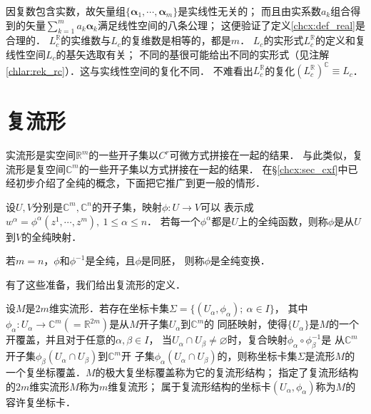 因复数包含实数，故矢量组$\{\boldsymbol{\alpha}_1,\cdots,\boldsymbol{\alpha}_m\}$是实线性无关的；
而且由实系数$a_k$组合得到的矢量$\sum_{k=1}^{m} a_k \boldsymbol{\alpha}_k$满足线性空间的八条公理；
这便验证了定义\ref{chcx:def_real}是合理的．
$L^{\mathbb{R}}_c$的{\kaishu 实维数}与$L_c$的{\kaishu 复维数}是相等的，都是$m$．
$L_c$的实形式$L^{\mathbb{R}}_c$的定义和复线性空间$L_c$的基矢选取有关；
不同的基很可能给出不同的实形式（见注解\ref{chlar:rek_rc}）．这与实线性空间的复化不同．
不难看出$L^{\mathbb{R}}_c$的复化$(L^{\mathbb{R}}_c)^{\mathbb{C}} \equiv L_c$．










\section{复流形}\label{chcx:sec_cxmanifold}
实流形是实空间$\mathbb{R}^m$的一些开子集以$C^r$可微方式拼接在一起的结果．
与此类似，复流形是复空间$\mathbb{C}^m$的一些开子集以方式拼接在一起的结果．
在\S\ref{chcx:sec_cxf}中已经初步介绍了全纯的概念，下面把它推广到更一般的情形．



\begin{definition}
    设$U,V$分别是$\mathbb{C}^m,\mathbb{C}^n$的开子集，映射$\phi:U\to V$可以
    表示成$w^\alpha=\phi^\alpha(z^1,\cdots,z^m),\ 1\leqslant \alpha \leqslant n$．
    若每一个$\phi^\alpha$都是$U$上的全纯函数，则称$\phi$是从$U$到$V$的{\heiti 全纯映射}．
    
    若$m=n$，$\phi$和$\phi^{-1}$是全纯，且$\phi$是同胚，
    则称$\phi$是{\heiti 全纯变换}．  
\end{definition}

有了这些准备，我们给出复流形的定义．
\begin{definition}\label{chcx:def_cxmanifold}
    设$M$是$2m$维实流形．若存在坐标卡集$\Sigma=\{(U_\alpha,\phi_\alpha);\ \alpha\in I\}$，
    其中$\phi_\alpha: U_\alpha \to \mathbb{C}^m(=\mathbb{R}^{2m})$是从$M$开子集$U_\alpha$到$\mathbb{C}^m$的
    同胚映射，使得$\{U_\alpha\}$是$M$的一个开覆盖，并且对于任意的$\alpha,\beta\in I$，
    当$U_\alpha \cap U_\beta \neq \varnothing$时，复合映射$\phi_\alpha \circ \phi^{-1}_\beta$是
    从$\mathbb{C}^m$开子集$\phi_\beta(U_\alpha \cap U_\beta)$到$\mathbb{C}^m$开
    子集$\phi_\alpha(U_\alpha \cap U_\beta)$的，则称坐标卡集$\Sigma$是流形$M$的
    一个{\heiti 复坐标覆盖}．$M$的极大复坐标覆盖称为它的{\heiti 复流形结构}；
    指定了复流形结构的$2m$维实流形$M$称为$m$维{\heiti 复流形}；
    属于复流形结构的坐标卡$(U_\alpha,\phi_\alpha)$称为$M$的{\heiti 容许复坐标卡}． 
\end{definition}

